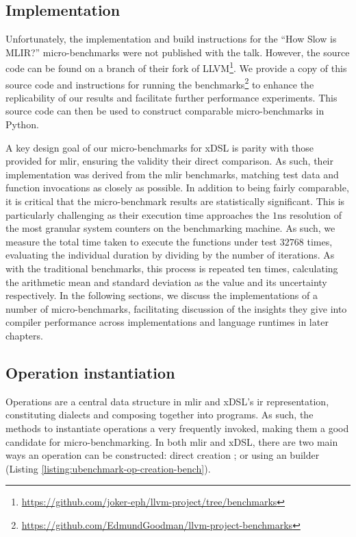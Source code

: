 \subsection{Implementation}
\label{ssec:ubenchmark-implementation}

Unfortunately, the implementation and build instructions for the ``How Slow is MLIR?'' micro-benchmarks were not published with the talk.
However, the source code can be found on a branch of their fork of LLVM\footnote{\scriptsize{\url{https://github.com/joker-eph/llvm-project/tree/benchmarks}}}. We provide a copy of this source code and instructions for running the benchmarks\footnote{\scriptsize{\url{https://github.com/EdmundGoodman/llvm-project-benchmarks}}} to enhance the replicability of our results and facilitate further performance experiments.
This source code can then be used to construct comparable micro-benchmarks in Python.

A key design goal of our micro-benchmarks for xDSL is parity with those provided for \ac{mlir}, ensuring the validity their direct comparison.
As such, their implementation was derived from the \ac{mlir} benchmarks, matching test data and function invocations as closely as possible.
In addition to being fairly comparable, it is critical that the micro-benchmark results are statistically significant. This is particularly challenging as their execution time approaches the $1$ns resolution of the most granular system counters on the benchmarking machine. As such, we measure the total time taken to execute the functions under test $32768$ times, evaluating the individual duration by dividing by the number of iterations. As with the traditional benchmarks, this process is repeated ten times, calculating the arithmetic mean and standard deviation as the value and its uncertainty respectively.
In the following sections, we discuss the implementations of a number of micro-benchmarks, facilitating discussion of the insights they give into compiler performance across implementations and language runtimes in later chapters.


\subsection{Operation instantiation}
\label{ssec:ubenchmark-operation-instantiation}

Operations are a central data structure in \ac{mlir} and xDSL's \ac{ir} representation, constituting dialects and composing together into programs.
As such, the methods to instantiate operations a very frequently invoked, making them a good candidate for micro-benchmarking.
In both \ac{mlir} and xDSL, there are two main ways an operation can be constructed: direct creation ; or using an builder  (Listing \ref{listing:ubenchmark-op-creation-bench}).

